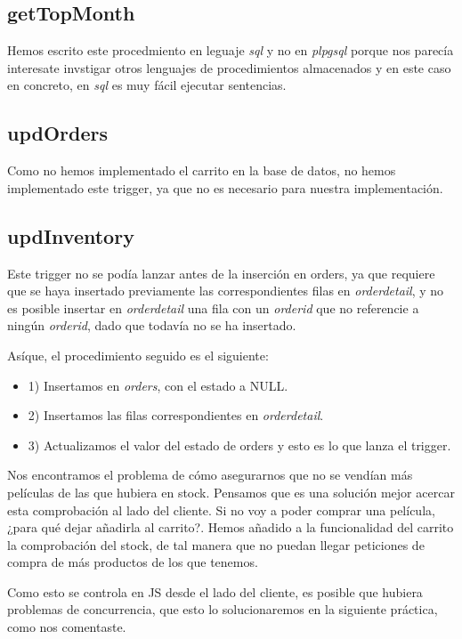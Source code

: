 \documentclass[nochap]{apuntes}
\begin{document}
\subsection{getTopMonth}
Hemos escrito este procedmiento en leguaje \textit{sql} y no en \textit{plpgsql} porque nos parecía interesate invstigar otros lenguajes de procedimientos almacenados y en este caso en concreto, en \textit{sql} es muy fácil ejecutar sentencias.

\subsection{updOrders}
Como no hemos implementado el carrito en la base de datos, no hemos implementado este trigger, ya que no es necesario para nuestra implementación. 

\subsection{updInventory}
Este trigger no se podía lanzar antes de la inserción en orders, ya que requiere que se haya insertado previamente las correspondientes filas en \textit{orderdetail}, y no es posible insertar en \textit{orderdetail} una fila con un \textit{orderid} que no referencie a ningún \textit{orderid}, dado que todavía no se ha insertado.

Asíque, el  procedimiento seguido es el siguiente:
\begin{itemize}
\item 1) Insertamos en \textit{orders}, con el estado a NULL.
\item 2) Insertamos las filas correspondientes en \textit{orderdetail}.
\item 3) Actualizamos el valor del estado de orders y esto es lo que lanza el trigger.
\end{itemize}

Nos encontramos el problema de cómo asegurarnos que no se vendían más películas de las que hubiera en stock. Pensamos que es una solución mejor acercar esta comprobación al lado del cliente. Si no voy a poder comprar una película, ¿para qué dejar añadirla al carrito?. Hemos añadido a la funcionalidad del carrito la comprobación del stock, de tal manera que no puedan llegar peticiones de compra de más productos de los que tenemos. 

Como esto se controla en JS desde el lado del cliente, es posible que hubiera problemas de concurrencia, que esto lo solucionaremos en la siguiente práctica, como nos comentaste.
\end{document}
